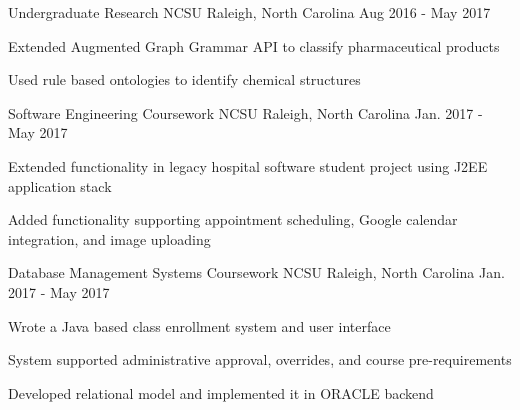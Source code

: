 
\begin{cventries}
	
\cventry
	{Undergraduate Research} %
	{NCSU} %
	{Raleigh, North Carolina} %
	{Aug 2016 - May 2017} %
	{
		\begin{cvitems} %
			\item {Extended Augmented Graph Grammar API to classify pharmaceutical products}
			\item {Used rule based ontologies to identify chemical structures}
		\end{cvitems}
	}

\cventry
	{Software Engineering Coursework} %
	{NCSU} %
	{Raleigh, North Carolina} %
	{Jan. 2017 - May 2017} %
	{
		\begin{cvitems} %
			\item {Extended functionality in legacy hospital software student project using J2EE application stack}
			\item {Added functionality supporting appointment scheduling, Google calendar integration, and image uploading}
		\end{cvitems}
	}

\cventry
	{Database Management Systems Coursework} %
	{NCSU} %
	{Raleigh, North Carolina} %
	{Jan. 2017 - May 2017} %
	{
		\begin{cvitems} %
			\item {Wrote a Java based class enrollment system and user interface}
			\item {System supported administrative approval, overrides, and course pre-requirements}
			\item {Developed relational model and implemented it in ORACLE backend}
		\end{cvitems}
	}



\end{cventries}
